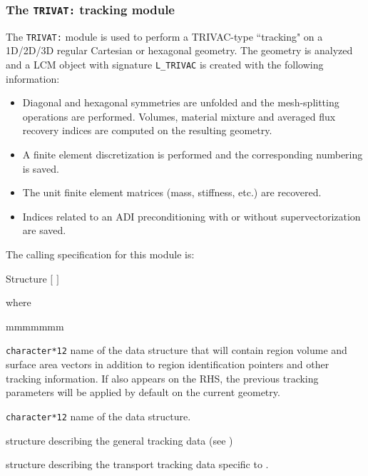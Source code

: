 \subsubsection{The {\tt TRIVAT:} tracking module}\label{sect:TRIVACData}

The {\tt TRIVAT:} module is used to perform a TRIVAC-type ``tracking"  on a
1D/2D/3D regular Cartesian or hexagonal geometry.\cite{BIVAC,TRIVAC} The
geometry is analyzed and a LCM object with signature {\tt L\_TRIVAC} is
created with the following information:

\begin{itemize}
\item Diagonal and hexagonal symmetries are unfolded and the mesh-splitting 
operations are performed. Volumes, material mixture and averaged flux recovery
indices are computed on the resulting geometry. \item A finite element
discretization is performed and the corresponding numbering is saved. \item The
unit finite element matrices (mass, stiffness, etc.) are recovered. \item
Indices related to an ADI preconditioning with or without supervectorization
are saved. \end{itemize}

The calling specification for this module is:

\begin{DataStructure}{Structure }
\moc{:=}  $[$  $]$ 
 \moc{::}   
\end{DataStructure}

\noindent  where
\begin{ListeDeDescription}{mmmmmmm}

\item[\dusa{TRKNAM}] {\tt character*12} name of the  data
structure that will contain region volume and surface area vectors in
addition to region identification pointers and other tracking information.
If  also appears on the RHS, the previous tracking 
parameters will be applied by default on the current geometry.

\item[\dusa{GEONAM}] {\tt character*12} name of the  data
structure.

\item[\dstr{desctrack}] structure describing the general tracking data (see
)

\item[\dstr{descTRIVAC}] structure describing the transport tracking data
specific to .

\end{ListeDeDescription}

